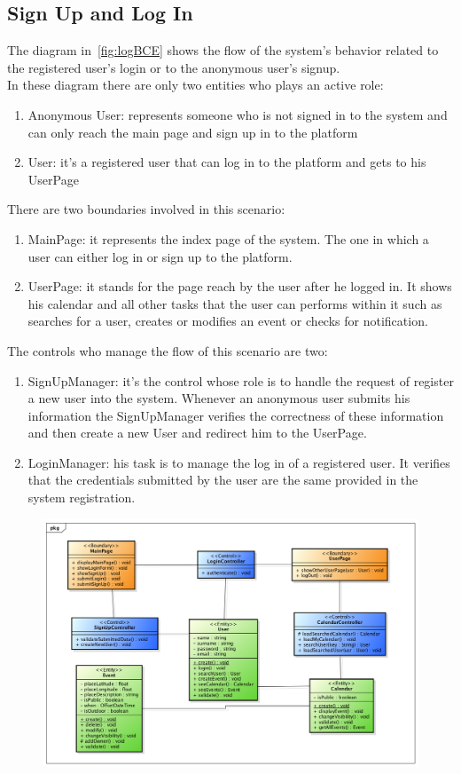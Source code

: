\begin{itemize}
\subsection{Sign Up and Log In }
The diagram in~\ref{fig:logBCE} shows the flow of the system's behavior related to the registered user's login or to the anonymous user's signup. \\In these diagram there are only two entities who plays an active role:
\begin{enumerate}
\item Anonymous User: represents someone who is not signed in  to the system and can only reach the main page and sign up in to the platform
\item User: it's a registered user that can log in to the platform and gets to his UserPage
\end{enumerate}
There are two boundaries involved in this scenario: \begin{enumerate}
\item MainPage: it represents the index page of the system. The one in which a user can either log in or sign up to the platform.
\item UserPage: it stands for the page reach by the user after he logged in. It shows his calendar and all other tasks that the user can performs within it such as searches for a user, creates or modifies an event or checks for notification.
 \end{enumerate}
The controls who manage the flow of this scenario are two:\begin{enumerate}
\item SignUpManager: it's the control whose role is to handle the request of register a new user into the system. Whenever an anonymous user submits his information the SignUpManager verifies the correctness of these information and then create a new User and redirect him to the UserPage.
\item LoginManager: his task is to manage the log in of a registered user. It verifies that the credentials submitted by the user are the same provided in the system registration.   
\end{enumerate}
\begin{center}
 \begin{figure}[H]
    \includegraphics[width=1\textwidth]{../BCEDiagram/BCE/EntityOverview/LoginBCE.png}

\end{figure}
\end{center}
\end{itemize}
